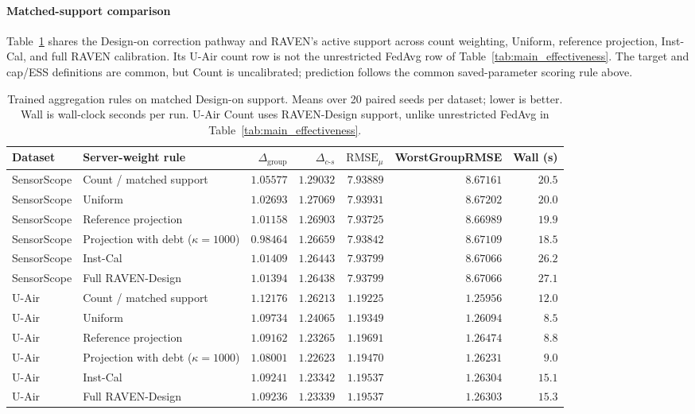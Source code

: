 \documentclass[letterpaper,journal]{IEEEtran}
\begin{document}
\paragraph{Matched-support comparison}
Table~\ref{tab:trained_rules} shares the Design-on correction pathway and
RAVEN's active support across count weighting, Uniform, reference projection,
Inst-Cal, and full RAVEN calibration.  Its U-Air count row is not the unrestricted FedAvg row
of Table~\ref{tab:main_effectiveness}.  The target and cap/ESS definitions are common, but Count is uncalibrated;
prediction follows the common saved-parameter scoring rule above.

\begin{table}[t]
\centering
\caption{Trained aggregation rules on matched Design-on support.
Means over 20 paired seeds per dataset; lower is better.
Wall is wall-clock seconds per run. U-Air Count uses RAVEN-Design support,
unlike unrestricted FedAvg in Table~\ref{tab:main_effectiveness}.
}
\label{tab:trained_rules}
\footnotesize
\setlength{\tabcolsep}{5pt}
\begin{tabular*}{\textwidth}{@{\extracolsep{\fill}}llrrrrr}
\toprule
Dataset & Server-weight rule & $\Delta_{\mathrm{group}}$ & $\Delta_{c\text{-}s}$ &
$\mathrm{RMSE}_\mu$ & WorstGroupRMSE & Wall (s)\\
\midrule
SensorScope & Count / matched support & $1.05577$ & $1.29032$ & $7.93889$ & $8.67161$ & $20.5$\\
SensorScope & Uniform & $1.02693$ & $1.27069$ & $7.93931$ & $8.67202$ & $20.0$\\
SensorScope & Reference projection & $1.01158$ & $1.26903$ & $7.93725$ & $8.66989$ & $19.9$\\
SensorScope & Projection with debt ($\kappa=1000$) & $0.98464$ & $1.26659$ & $7.93842$ & $8.67109$ & $18.5$\\
SensorScope & Inst-Cal & $1.01409$ & $1.26443$ & $7.93799$ & $8.67066$ & $26.2$\\
SensorScope & Full RAVEN-Design & $1.01394$ & $1.26438$ & $7.93799$ & $8.67066$ & $27.1$\\
\midrule
U-Air & Count / matched support & $1.12176$ & $1.26213$ & $1.19225$ & $1.25956$ & $12.0$\\
U-Air & Uniform & $1.09734$ & $1.24065$ & $1.19349$ & $1.26094$ & $8.5$\\
U-Air & Reference projection & $1.09162$ & $1.23265$ & $1.19691$ & $1.26474$ & $8.8$\\
U-Air & Projection with debt ($\kappa=1000$) & $1.08001$ & $1.22623$ & $1.19470$ & $1.26231$ & $9.0$\\
U-Air & Inst-Cal & $1.09241$ & $1.23342$ & $1.19537$ & $1.26304$ & $15.1$\\
U-Air & Full RAVEN-Design & $1.09236$ & $1.23339$ & $1.19537$ & $1.26303$ & $15.3$\\
\bottomrule
\end{tabular*}
\end{table}
\end{document}
